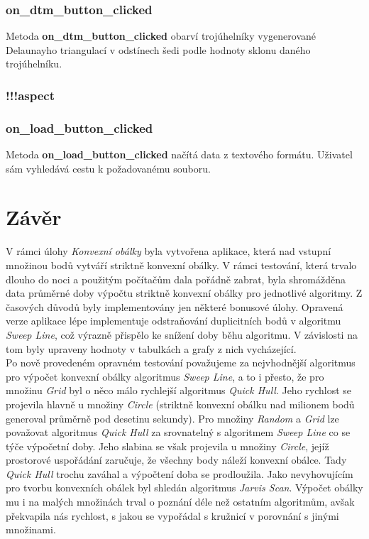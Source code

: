 \documentclass[a4paper, 12pt]{article}
\begin{document}
\subsubsection*{on\_dtm\_button\_clicked}
Metoda \textbf{on\_dtm\_button\_clicked} obarví trojúhelníky vygenerované Delaunayho triangulací v odstínech šedi podle hodnoty sklonu daného trojúhelníku.

\subsubsection*{!!!aspect}


\subsubsection*{on\_load\_button\_clicked}
Metoda \textbf{on\_load\_button\_clicked} načítá data z textového formátu. Uživatel sám vyhledává cestu k požadovanému souboru.


\clearpage
\section{Závěr}
V rámci úlohy \textit{Konvexní obálky} byla vytvořena aplikace, která nad vstupní množinou bodů vytváří striktně konvexní obálky. V rámci testování, která trvalo dlouho do noci a použitým počítačům dala pořádně zabrat, byla shromážděna data průměrné doby výpočtu striktně konvexní obálky pro jednotlivé algoritmy. Z časových důvodů byly implementovány jen některé bonusové úlohy. Opravená verze aplikace lépe implementuje odstraňo\-vá\-ní duplicitních bodů v algoritmu \textit{Sweep Line}, což výrazně přispělo ke snížení doby běhu algoritmu. V závislosti na tom byly upraveny hodnoty v tabulkách a grafy z nich vycházející.\\

Po nově provedeném opravném testování považujeme za nejvhodnější algoritmus pro výpočet konvexní obálky algoritmus \textit{Sweep Line}, a to i přesto, že pro množinu \textit{Grid} byl o něco málo rychlejší algoritmus \textit{Quick Hull}. Jeho rychlost se projevila hlavně u množiny \textit{Circle} (striktně konvexní obálku nad milionem bodů generoval průměrně pod desetinu sekundy). Pro množiny \textit{Random} a \textit{Grid} lze považovat algoritmus \textit{Quick Hull} za srovnatelný s algoritmem \textit{Sweep Line} co se týče výpočetní doby. Jeho slabina se však projevila u množiny \textit{Circle}, jejíž prostorové uspořádání zaručuje, že všechny body náleží konvexní obálce. Tady \textit{Quick Hull} trochu zaváhal a výpočtení doba se prodloužila. Jako nevyhovujícím pro tvorbu konvexních obálek byl shledán algoritmus \textit{Jarvis Scan}. Výpočet obálky mu i na malých množinách trval o poznání déle než ostatním algoritmům, avšak překvapila nás rychlost, s jakou se vypořádal s kružnicí v porovnání s jinými množinami.\\
\end{document}
